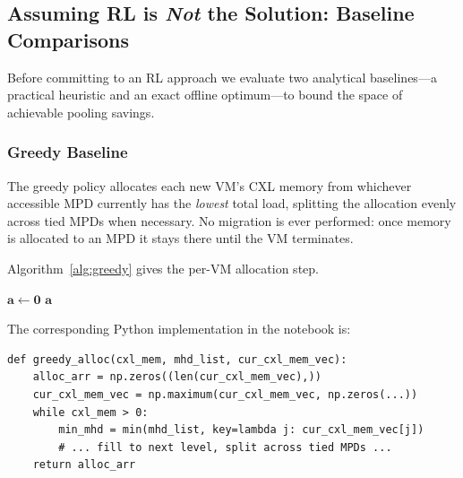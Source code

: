 \documentclass[11pt]{article}
\begin{document}
\subsection{Assuming RL is \emph{Not} the Solution: Baseline Comparisons}
\label{sec:baselines}

Before committing to an RL approach we evaluate two analytical baselines---a
practical heuristic and an exact offline optimum---to bound the space of
achievable pooling savings.

\subsubsection*{Greedy Baseline}

The greedy policy allocates each new VM's CXL memory from whichever
accessible MPD currently has the \emph{lowest} total load, splitting the
allocation evenly across tied MPDs when necessary.  No migration is ever
performed: once memory is allocated to an MPD it stays there until the VM
terminates.

Algorithm~\ref{alg:greedy} gives the per-VM allocation step.

\begin{algorithm}[H]
\SetAlgoLined
{}
$\mathbf{a} \leftarrow \mathbf{0}$\;
\Return $\mathbf{a}$\;
\caption{Greedy allocation for a single VM arrival.}
\label{alg:greedy}
\end{algorithm}

The corresponding Python implementation in the notebook is:

\begin{lstlisting}[caption={Python implementation of greedy allocation.}]
def greedy_alloc(cxl_mem, mhd_list, cur_cxl_mem_vec):
    alloc_arr = np.zeros((len(cur_cxl_mem_vec),))
    cur_cxl_mem_vec = np.maximum(cur_cxl_mem_vec, np.zeros(...))
    while cxl_mem > 0:
        min_mhd = min(mhd_list, key=lambda j: cur_cxl_mem_vec[j])
        # ... fill to next level, split across tied MPDs ...
    return alloc_arr
\end{lstlisting}
\end{document}

